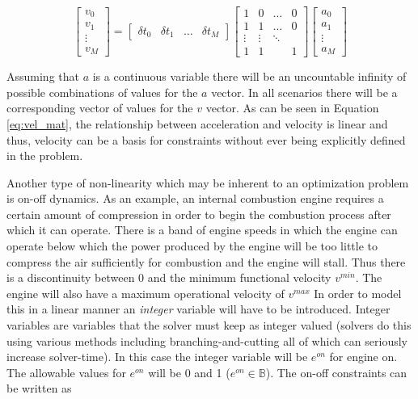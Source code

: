 \documentclass[12pt]{article}
\begin{document}
\begin{equation}
	\begin{bmatrix}
		v_0 \\ v_1 \\ \vdots \\ v_M
	\end{bmatrix}=
	\begin{bmatrix}
		\delta t_0 & \delta t_1 & \dots & \delta t_M
	\end{bmatrix}
	\begin{bmatrix}
		1 & 0 & \dots & 0\\
		1 & 1 & \dots & 0\\
		\vdots & \vdots &\ddots & \\
		1 & 1 & & 1
	\end{bmatrix}
	\begin{bmatrix}
		a_0 \\ a_1 \\ \vdots \\ a_M
	\end{bmatrix}
	\label{eq:vel_mat}
\end{equation}

Assuming that $a$ is a continuous variable there will be an uncountable infinity of possible combinations of values for the $a$ vector. In all scenarios there will be a corresponding vector of values for the $v$ vector. As can be seen in Equation \eqref{eq:vel_mat}, the relationship between acceleration and velocity is linear and thus, velocity can be a basis for constraints without ever being explicitly defined in the problem.

Another type of non-linearity which may be inherent to an optimization problem is on-off dynamics. As an example, an internal combustion engine requires a certain amount of compression in order to begin the combustion process after which it can operate. There is a band of engine speeds in which the engine can operate below which the power produced by the engine will be too little to compress the air sufficiently for combustion and the engine will stall. Thus there is a discontinuity between 0 and the minimum functional velocity $v^{min}$. The engine will also have a maximum operational velocity of $v^{max}$ In order to model this in a linear manner an \textit{integer} variable will have to be introduced. Integer variables are variables that the solver must keep as integer valued (solvers do this using various methods including branching-and-cutting all of which can seriously increase solver-time). In this case the integer variable will be $e^{on}$ for engine on.
The allowable values for $e^{on}$ will be 0 and 1 ($e^{on}\in\mathbb{B}$). The on-off constraints can be written as
\end{document}
